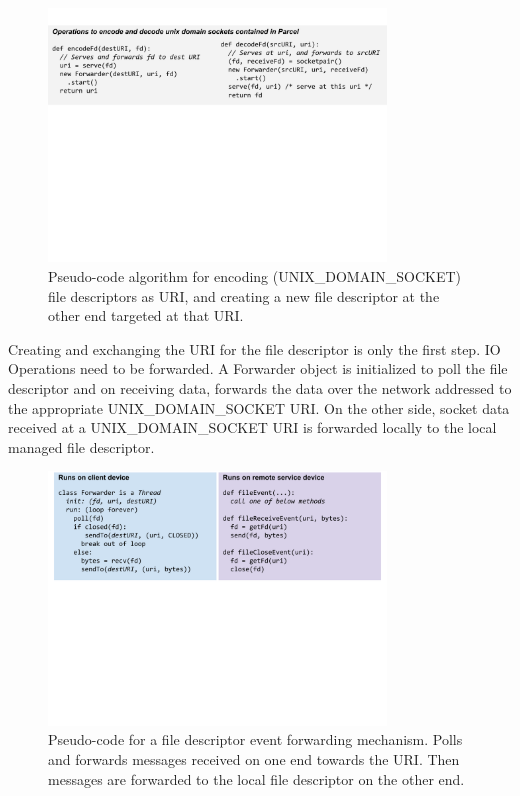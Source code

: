 \documentclass[prodmode]{acmlarge}
\begin{document}
\begin{figure}[h]
\centering
\includegraphics[width=0.8\textwidth]{drawings/encodeFds.pdf}
\caption{Pseudo-code algorithm for encoding (UNIX\_DOMAIN\_SOCKET) file descriptors as URI, and creating a new file descriptor at the other end targeted at that URI.}
\end{figure}

Creating and exchanging the URI for the file descriptor is only the first step. IO Operations need to be forwarded. A Forwarder object is initialized to poll the file descriptor and on receiving data, forwards the data over the network addressed to the appropriate UNIX\_DOMAIN\_SOCKET URI. On the other side, socket data received at a UNIX\_DOMAIN\_SOCKET URI is forwarded locally to the local managed file descriptor.

\begin{figure}[h]
\centering
\includegraphics[width=0.8\textwidth]{drawings/forwardFds.pdf}
\caption{Pseudo-code for a file descriptor event forwarding mechanism. Polls and forwards messages received on one end towards the URI. Then messages are forwarded to the local file descriptor on the other end.}
\end{figure}
\end{document}
